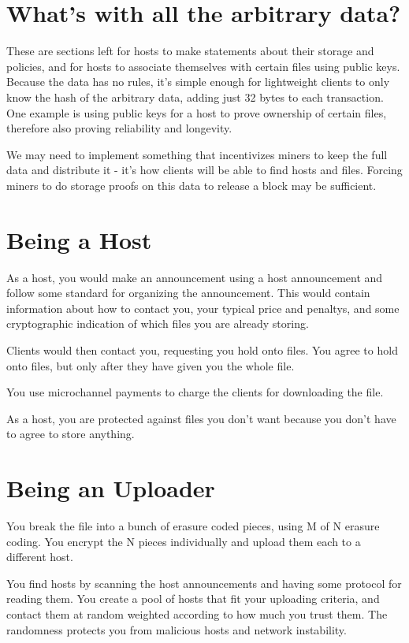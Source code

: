 \documentclass[twocolumn]{article}
\begin{document}
\section{What's with all the arbitrary data?}
These are sections left for hosts to make statements about their storage and policies, and for hosts to associate themselves with certain files using public keys.
Because the data has no rules, it's simple enough for lightweight clients to only know the hash of the arbitrary data, adding just 32 bytes to each transaction.
One example is using public keys for a host to prove ownership of certain files, therefore also proving reliability and longevity.

We may need to implement something that incentivizes miners to keep the full data and distribute it - it's how clients will be able to find hosts and files.
Forcing miners to do storage proofs on this data to release a block may be sufficient.

\section{Being a Host}
As a host, you would make an announcement using a host announcement and follow some standard for organizing the announcement.
This would contain information about how to contact you, your typical price and penaltys, and some cryptographic indication of which files you are already storing.

Clients would then contact you, requesting you hold onto files.
You agree to hold onto files, but only after they have given you the whole file.

You use microchannel payments to charge the clients for downloading the file.

As a host, you are protected against files you don't want because you don't have to agree to store anything.

\section{Being an Uploader}
You break the file into a bunch of erasure coded pieces, using M of N erasure coding.
You encrypt the N pieces individually and upload them each to a different host.

You find hosts by scanning the host announcements and having some protocol for reading them.
You create a pool of hosts that fit your uploading criteria, and contact them at random weighted according to how much you trust them.
The randomness protects you from malicious hosts and network instability.
\end{document}
